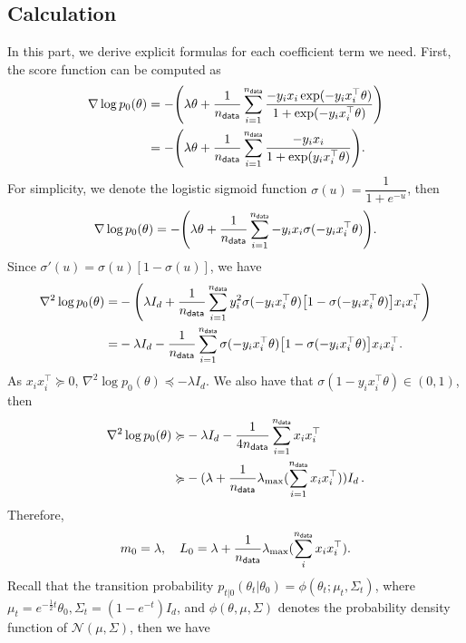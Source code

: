 \subsection{Calculation}
In this part, we derive explicit formulas for each coefficient term we need. First, the score function can be computed as
\begin{align*}
    \nabla\log p_0(\theta)
    &=-\left(\lambda \theta+\dfrac{1}{n_{\sf data}}\sum_{i=1}^{n_{\sf data}}\dfrac{-y_ix_i\exp(-y_ix_i^\top \theta)}{1+\exp(-y_ix_i^\top \theta)}\right)\\
    &=-\left(\lambda \theta+\dfrac{1}{n_{\sf data}}\sum_{i=1}^{n_{\sf data}}\dfrac{-y_ix_i}{1+\exp(y_ix_i^\top \theta)}\right).
\end{align*}
For simplicity, we denote the logistic sigmoid function $\sigma(u)=\dfrac{1}{1+e^{-u}}$, then
\begin{align*}
	\nabla\log p_0(\theta)=-\left(\lambda \theta+\dfrac{1}{n_{\sf data}}\sum_{i=1}^{n_{\sf data}}-y_ix_i\sigma(-y_ix_i^\top \theta)\right).
\end{align*}
Since $\sigma'(u)=\sigma(u)[1-\sigma(u)]$, we have
\begin{align*}
	\nabla^2\log p_0(\theta)
    =&-\left(\lambda I_d+\dfrac{1}{n_{\sf data}}\sum_{i=1}^{n_{\sf data}}y_i^2\sigma(-y_ix_i^\top \theta)\left[1-\sigma(-y_ix_i^\top \theta)\right]x_ix_i^\top\right)\\
	=&-\lambda I_d-\dfrac{1}{n_{\sf data}}\sum_{i=1}^{n_{\sf data}}\sigma(-y_ix_i^\top \theta)\left[1-\sigma(-y_ix_i^\top \theta)\right]x_ix_i^\top.
\end{align*}
As $x_ix_i^\top\succcurlyeq 0$, $\nabla^2\log p_0(\theta)\preccurlyeq-\lambda I_d$. We also have that $\sigma(1-y_ix_i^\top \theta)\in(0,1)$, then
\begin{align*}
	\nabla^2\log p_0(\theta)\succcurlyeq&-\lambda I_d-\dfrac{1}{4n_{\sf data}}\sum_{i=1}^{n_{\sf data}}x_ix_i^\top\\
    \succcurlyeq&-(\lambda+\dfrac{1}{n_{\sf data}}\lambda_{\max}(\sum_{i=1}^{n_{\sf data}}x_ix_i^\top))I_d\,.
\end{align*}
Therefore, 
\begin{align*}
	m_0=\lambda,\quad L_0=\lambda+\dfrac{1}{n_{\sf data}}\lambda_{\max}(\sum_{i}^{n_{\sf data}}x_ix_i^\top).
\end{align*}
Recall that the transition probability $p_{t|0}(\theta_t|\theta_0)=\phi(\theta_t;\mu_t,\Sigma_t)$, where $\mu_t=e^{-\frac{1}{2}t}\theta_0,\Sigma_t=(1-e^{-t})I_d$, and $\phi(\theta,\mu,\Sigma)$ denotes the probability density function of $\mathcal{N}(\mu,\Sigma)$, then we have
